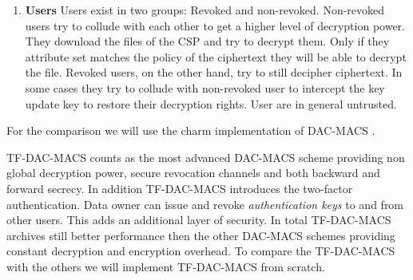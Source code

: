 \begin{enumerate}
	\item \textbf{Users} Users exist in two groups: Revoked and non-revoked. Non-revoked users try to collude with each other to get a higher level of decryption power. They download the files of the \ac{CSP} and try to decrypt them. Only if they attribute set matches the policy of the ciphertext they will be able to decrypt the file. 
	Revoked users, on the other hand, try to still decipher ciphertext. In some cases they try to collude with non-revoked user to intercept the key update key to restore their decryption rights. 
	User are in general untrusted.
\end{enumerate} 

For the comparison we will use the charm implementation of DAC-MACS \cite{yang2013dac}.

\ac{TF-DAC-MACS} counts as the most advanced \ac{DAC-MACS} scheme providing non global decryption power, secure revocation channels and both backward and forward secrecy. In addition \ac{TF-DAC-MACS} introduces the two-factor authentication. Data owner can issue and revoke \textit{authentication keys} to and from other users. This adds an additional layer of security. In total \ac{TF-DAC-MACS} archives still better performance then the other \ac{DAC-MACS} schemes providing constant decryption and encryption overhead. 
To compare the TF-DAC-MACS with the others we will implement TF-DAC-MACS from scratch. 

